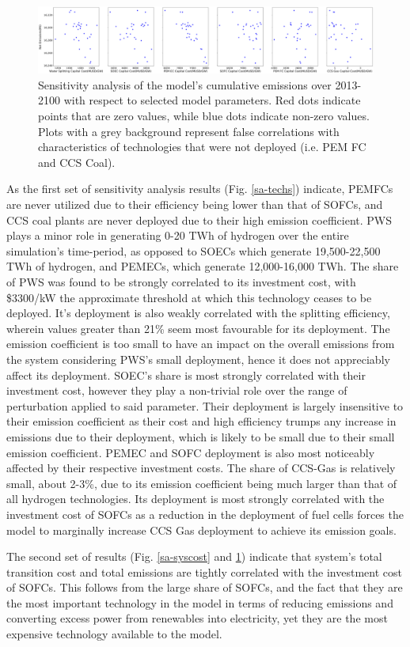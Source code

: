 \begin{figure}[h] 
\centering
\hspace*{-3cm}
\includegraphics[scale=0.2]{figures/co2emi}
\caption{Sensitivity analysis of the model's cumulative emissions over 2013-2100 with respect to selected model parameters. Red dots indicate points that are zero values, while blue dots indicate non-zero values. Plots with a grey background represent false correlations with characteristics of technologies that were not deployed (i.e. PEM FC and CCS Coal).}
\label{sa-co2}
\end{figure}

As the first set of sensitivity analysis results (Fig. \ref{sa-techs}) indicate, \gls{PEMFC}s are never utilized due to their efficiency being lower than that of \gls{SOFC}s, and \gls{CCS} coal plants are never deployed due to their high emission coefficient. \gls{PWS} plays a minor role in generating 0-20 TWh of hydrogen over the entire simulation's time-period, as opposed to \gls{SOEC}s which generate 19,500-22,500 TWh of hydrogen, and \gls{PEMEC}s, which generate 12,000-16,000 TWh. The share of \gls{PWS} was found to be strongly correlated to its investment cost, with \$3300/kW the approximate threshold at which this technology ceases to be deployed. It's deployment is also weakly correlated with the splitting efficiency, wherein values greater than 21\% seem most favourable for its deployment. The emission coefficient is too small to have an impact on the overall emissions from the system considering \gls{PWS}'s small deployment, hence it does not appreciably affect its deployment. \gls{SOEC}'s share is most strongly correlated with their investment cost, however they play a non-trivial role over the range of perturbation applied to said parameter. Their deployment is largely insensitive to their emission coefficient as their cost and high efficiency trumps any increase in emissions due to their deployment, which is likely to be small due to their small emission coefficient. \gls{PEMEC} and \gls{SOFC} deployment is also most noticeably affected by their respective investment costs. The share of \gls{CCS}-Gas is relatively small, about 2-3\%, due to its emission coefficient being much larger than that of all hydrogen technologies. Its deployment is most strongly correlated with the investment cost of \gls{SOFC}s as a reduction in the deployment of fuel cells forces the model to marginally increase CCS Gas deployment to achieve its emission goals.

The second set of results (Fig. \ref{sa-syscost} and \ref{sa-co2}) indicate that system's total transition cost and total emissions are tightly correlated with the investment cost of \gls{SOFC}s. This follows from the large share of \gls{SOFC}s, and the fact that they are the most important technology in the model in terms of reducing emissions and converting excess power from renewables into electricity, yet they are the most expensive technology available to the model.